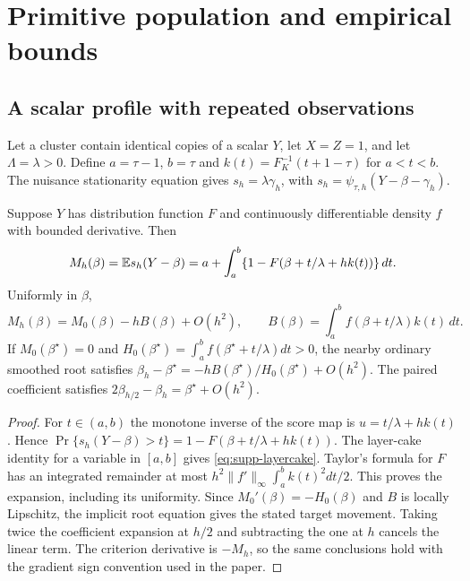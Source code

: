 \section{Primitive population and empirical bounds}\label{supp:primitive}

\subsection{A scalar profile with repeated observations}

Let a cluster contain identical copies of a scalar $Y$, let $X=Z=1$,
and let $\Lambda=\lambda>0$. Define $a=\tau-1$, $b=\tau$ and
$k(t)=F_K^{-1}(t+1-\tau)$ for $a<t<b$. The nuisance stationarity
equation gives $s_h=\lambda\gamma_h$, with
$s_h=\psi_{\tau,h}(Y-\beta-\gamma_h)$.

\begin{theorem}\label{thm:supp-repeated}
Suppose $Y$ has distribution function $F$ and continuously
differentiable density $f$ with bounded derivative. Then
\begin{equation}\label{eq:supp-layercake}
 M_h(\beta)=\mathbb{E} s_h(Y-\beta)
 =a+\int_a^b\{1-F(\beta+t/\lambda+h k(t))\}\,dt.
\end{equation}
Uniformly in $\beta$,
\[
 M_h(\beta)=M_0(\beta)-hB(\beta)+O(h^2),\qquad
 B(\beta)=\int_a^bf(\beta+t/\lambda)k(t)\,dt.
\]
If $M_0(\beta^\star)=0$ and
$H_0(\beta^\star)=\int_a^bf(\beta^\star+t/\lambda)dt>0$, the
nearby ordinary smoothed root satisfies
$\beta_h-\beta^\star=-hB(\beta^\star)/H_0(\beta^\star)+O(h^2)$.
The paired coefficient satisfies
$2\beta_{h/2}-\beta_h=\beta^\star+O(h^2)$.
\end{theorem}

\begin{proof}
For $t\in(a,b)$ the monotone inverse of the score map is
$u=t/\lambda+h k(t)$. Hence
$\Pr\{s_h(Y-\beta)>t\}=1-F(\beta+t/\lambda+h k(t))$.
The layer-cake identity for a variable in $[a,b]$ gives
\eqref{eq:supp-layercake}. Taylor's formula for $F$ has an integrated
remainder at most $h^2\|f'\|_\infty\int_a^bk(t)^2dt/2$.
This proves the expansion, including its uniformity.
Since $M_0'(\beta)=-H_0(\beta)$ and $B$ is locally Lipschitz,
the implicit root equation gives the stated target movement.
Taking twice the coefficient expansion at $h/2$ and subtracting the
one at $h$ cancels the linear term. The criterion derivative is $-M_h$, so the
same conclusions hold with the gradient sign convention used in the
paper.
\end{proof}


